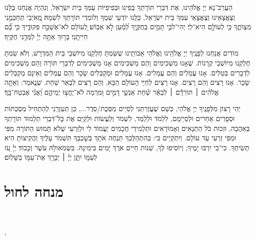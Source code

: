 \documentclass[twoside, openany, parskip=half, 11pt]{book}
\begin{document}
הַעֲרֵב־נָא יְיָ אֱלֹהֵינוּ, אֶת דִּבְרֵי תּוֹרָתְךָ בְּֽפִינוּ וּבְפִיפִיּוֹת עַמְּךָ בֵּית יִשְׂרָאֵל, וְנִהְיֶה אֲנַחְנוּ כֻּֽלָּנוּ וְצֶאֱצָאֵינוּ וְצֶאֱצָאֵי עַמְּךָ בֵּית יִשְׂרָאֵל, כֻּלָּֽנוּ יוֹדְעֵי שְׁמֶךָ וְלוֹמְדֵי תּוֹרָתְךָ לִשְׁמָהּ׃%
מֵֽ֭אֹיְבַי תְּחַכְּמֵ֣נִי מִצְוֺתֶ֑ךָ כִּ֖י לְעוֹלָ֣ם הִיא־לִֽי׃ יְהִי־לִבִּ֣י תָמִ֣ים בְּחֻקֶּ֑יךָ לְ֝מַ֗עַן לֹ֣א אֵבֽוֹשׁ׃ לְ֭עוֹלָם לֹא־אֶשְׁכַּ֣ח פִּקּוּדֶ֑יךָ כִּ֥י בָ֗֝ם חִיִּיתָֽנִי׃ בָּר֖וּךְ אַתָּ֥ה יְיָ֗ לַמְּדֵ֥נִי חֻקֶּֽיךָ׃

מוֹדִים אֲנַחְנוּ לְפָנֶֽיךָ יְיָ אֱלֹהֵֽינוּ וֶאֱלֹהֵי אַבוֹתֵֽינוּ שֶׁשַּׂמְתָּ חֶלְקֵֽנוּ מִיּוֹשְׁבֵי בֵּית הַמִּדְרָשׁ, וְלֹא שַׂמְתָּ חֶלְקֵֽנוּ מִיּוֹשְׁבֵי קְרָנוֹת. שֶׁאָנוּ מַשְׁכִּימִים וְהֵם מַשְׁכִּימִים אָנוּ מַשְׁכִּימִים לְדִבְרֵי תּוֹרָה וְהֵם מַשְׁכִּימִים לִדְבָרִים בְּטֵלִים. אָנוּ עֲמֵלִים וְהֵם עֲמֵלִים. אָנוּ עֲמֵלִים וּמְקַבְּלִים שָׂכָר וְהֵם עֲמֵלִים וְאֵינָם מְקַבְּלִים שָׂכָר. אָנוּ רָצִים וְהֵם רָצִים. אָנוּ רָצִים לְחַיֵּי הָעוֹלָם הַבָּא, וְהֵם רָצִים לִבְאֵר שַׁחַת. שֶׁנֱאמַר:
וְאַתָּ֤ה אֱלֹהִ֨ים ׀ תּוֹרִדֵ֬ם ׀ לִבְאֵ֬ר שַׁ֗חַת אַנְשֵׁ֤י דָמִ֣ים וּ֭מִרְמָה לֹא־יֶחֱצ֣וּ יְמֵיהֶ֑ם וַ֝אֲנִ֗י אֶבְטַח־בָּֽךְ׃

יְהִי רָצוֹן מִלְּפָנֶֽיךָ יְיָ אֱלֹהֵי, כְּשֵׁם שֶׁעֲזַרֽתַּנִי לְסַיֵים מַסֶּכֶת/סֵדֶר..., כֵּן תְּעַזְרֵֽנִי לְהַתְחִיל מְסֶכְתוֹת וּסְפָרִים אַחֵרים וּלְסַיֵימָם, לִלְמֹד וּלְלַמֵּד, לִשְׁמֹר וְלַעֲשׂוֹת וּלְקַיֵּם אֶת כׇּל־דִּבְרֵי תַלְמוּד תּוֹרָתְךָ בְּאַהֲבָה, וּזְכוּת כֹֹּל הַתְנָאִים וְאָמוֹרָאִים וּתַּלְמִידֵי חֲכָמִים יַעֲמוֹד לִי וּלְזַרְעִי שֶׁלֹא תָּמוּש הַתּוֹרָה מִפִּי וּמִפִּי זַרְעִי עַד עוֹלָם. וַיִתְקַיֵים בִּי: בְּהִתְהַלֶּכְךָ תַּנְחֶה אֹתָךְ בְּשׇׁכְבְּךָ תִּשְׁמֹר עָלֶיךָ וַהֲקִיצוֹתָ הִיא תְשִׂיחֶךָ. כִּי־בִי יִרְבּוּ יָמֶיךָ; וְיוֹסִיפוּ לְּךָ, שְׁנוֹת חַיִּים אֹרֶךְ יָמִים בִּימִינָהּ. בִּשְׂמֹאולָהּ עֹשֶׁר וְכָבוֹד׃
יְיָ֗ עֹ֭ז לְעַמּ֣וֹ יִתֵּ֑ן יְיָ֓ ׀ יְבָרֵ֖ךְ אֶת־עַמּ֣וֹ בַשָּׁלֽוֹם׃

\kaddishitchadeta

\chapter[מנחה לחול]{ מנחה לחול }
\tamid

\ketoret
\sepline\\

\ashrei

\halfkaddish

,
\end{document}

